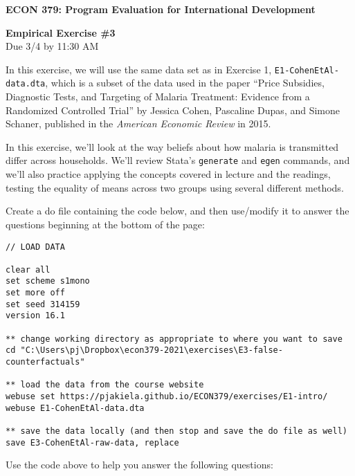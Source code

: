 \documentclass[11pt]{article}
\begin{document}
\begin{center}

\textbf{\large{ECON 379:  Program Evaluation for International Development}} \\

\bigskip

\textbf{\large{Empirical Exercise \#3}} \\ 
Due 3/4 by 11:30 AM 

\end{center}

\bigskip

\bigskip

In this exercise, we will use the same data set as in Exercise 1, 
\texttt{E1-CohenEtAl-data.dta}, which is a subset of the data used in the paper 
``Price Subsidies, Diagnostic Tests, and Targeting of Malaria Treatment: 
Evidence from a Randomized Controlled Trial'' by Jessica Cohen, Pascaline 
Dupas, and Simone Schaner, published in the \emph{American Economic Review} in 2015. 

\bigskip 

In this exercise, we'll look at the way beliefs about how malaria is 
transmitted differ across households.  We'll review Stata's \texttt{generate} and \texttt{egen} commands, 
and we'll also practice applying the concepts covered in lecture and the 
readings, testing the equality of means across two groups using several 
different methods.

\bigskip

Create a do file containing the code below, and then use/modify it to answer the questions beginning at the bottom of the page:

\begin{verbatim}
// LOAD DATA

clear all 
set scheme s1mono 
set more off
set seed 314159
version 16.1

** change working directory as appropriate to where you want to save
cd "C:\Users\pj\Dropbox\econ379-2021\exercises\E3-false-counterfactuals"

** load the data from the course website
webuse set https://pjakiela.github.io/ECON379/exercises/E1-intro/
webuse E1-CohenEtAl-data.dta

** save the data locally (and then stop and save the do file as well)
save E3-CohenEtAl-raw-data, replace
\end{verbatim}

\bigskip

\noindent
Use the code above to help you answer the following questions:
\end{document}
